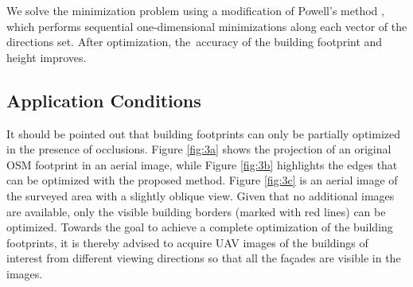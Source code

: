 We solve the minimization problem using a modification of Powell’s method \cite{powell1964efficient, press1989numerical}, which performs sequential one-dimensional minimizations along each vector of the directions set. After optimization, the~accuracy of the building footprint and height improves. 





\subsection{Application Conditions}
It should be pointed out that building footprints can only be partially optimized in the presence of occlusions. Figure \ref{fig:3a} shows the projection of an original OSM footprint in an aerial image, while Figure \ref{fig:3b} highlights the edges that can be optimized with the proposed method. Figure \ref{fig:3c} is an aerial image of the surveyed area with a slightly oblique view. Given that no additional images are available, only the visible building borders (marked with red lines) can be optimized. Towards the goal to achieve a complete optimization of the building footprints, it is thereby advised to acquire UAV images of the buildings of interest from different viewing directions so that all the fa\c{c}ades are visible in the images. 

 

